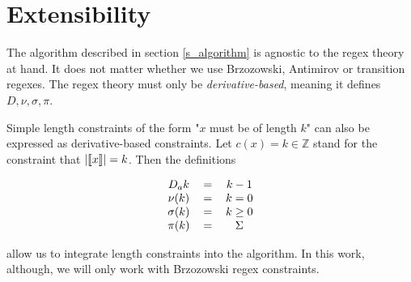 \section{Extensibility}
The algorithm described in section \ref{s_algorithm} is agnostic to the regex theory at hand. It does not matter whether we use Brzozowski, Antimirov or transition regexes. The regex theory must only be \textit{derivative-based}, meaning it defines $D, \nu, \sigma, \pi$.

Simple length constraints of the form "$x$ must be of length $k$" can also be expressed as derivative-based constraints. Let $c(x) = k \in \mathbb{Z}$ stand for the constraint that $|\llbracket x \rrbracket| = k$. Then the definitions

\[
\begin{tabular}{c c c}
    $D_ak$ & $=$ & $k-1$ \\
    $\nu(k)$ & $=$ & $k = 0$ \\
    $\sigma(k)$ & $=$ & $k \geq 0$ \\
    $\pi(k)$ & $=$ & $\Sigma$ \\
\end{tabular}
\]

allow us to integrate length constraints into the algorithm. In this work, although, we will only work with Brzozowski regex constraints.